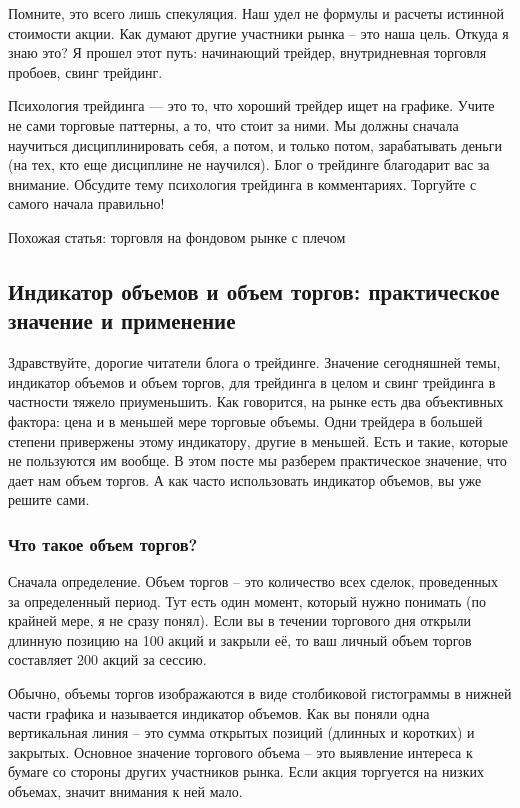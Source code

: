 \documentclass[a5paper]{article}
\begin{document}
Помните, это всего лишь спекуляция. Наш удел не формулы и расчеты истинной стоимости акции. Как думают другие участники рынка – это наша цель. Откуда я знаю это? Я прошел этот путь: начинающий трейдер, внутридневная торговля пробоев, свинг трейдинг.

Психология трейдинга — это то, что хороший трейдер ищет на графике. Учите не сами торговые паттерны, а то, что стоит за ними. Мы должны сначала научиться дисциплинировать себя, а потом, и только потом, зарабатывать деньги (на тех, кто еще дисциплине не научился). Блог о трейдинге благодарит вас за внимание. Обсудите тему психология трейдинга в комментариях. Торгуйте с самого начала правильно!


Похожая статья: торговля на фондовом рынке с плечом

\subsection{Индикатор объемов и объем торгов: практическое значение и
  применение}

Здравствуйте, дорогие читатели блога о трейдинге. Значение сегодняшней
темы, индикатор объемов и объем торгов, для трейдинга в целом и свинг
трейдинга в частности тяжело приуменьшить. Как говорится, на рынке
есть два объективных фактора: цена и в меньшей мере торговые
объемы. Одни трейдера в большей степени привержены этому индикатору,
другие в меньшей. Есть и такие, которые не пользуются им вообще. В
этом посте мы разберем практическое значение, что дает нам объем
торгов. А как часто использовать индикатор объемов, вы уже решите
сами.

\subsubsection{Что такое объем торгов?}

Сначала определение. Объем торгов – это количество всех сделок, проведенных за определенный период. Тут есть один момент, который нужно понимать (по крайней мере, я не сразу понял). Если вы в течении торгового дня открыли длинную позицию на 100 акций и закрыли её, то ваш личный объем торгов составляет 200 акций за сессию.

Обычно, объемы торгов изображаются в виде столбиковой гистограммы в
нижней части графика и называется индикатор объемов. Как вы поняли
одна вертикальная линия – это сумма открытых позиций (длинных и
коротких) и закрытых. Основное значение торгового объема – это
выявление интереса к бумаге со стороны других участников рынка. Если
акция торгуется на низких объемах, значит внимания к ней мало.
\end{document}
